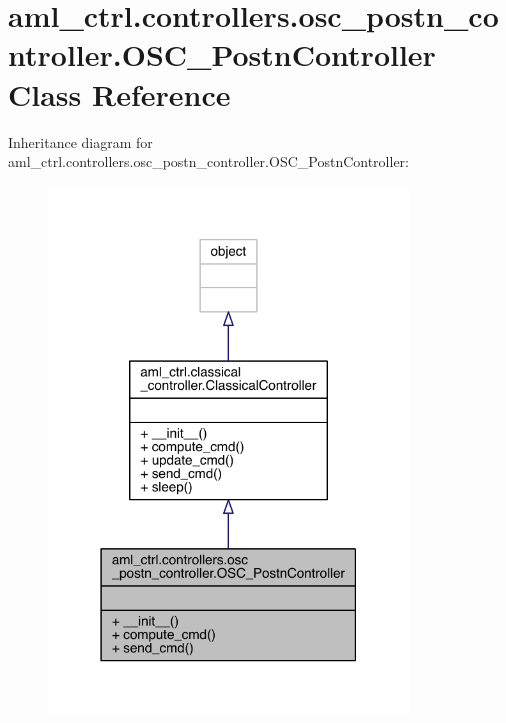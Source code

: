 \hypertarget{classaml__ctrl_1_1controllers_1_1osc__postn__controller_1_1_o_s_c___postn_controller}{}\section{aml\+\_\+ctrl.\+controllers.\+osc\+\_\+postn\+\_\+controller.\+O\+S\+C\+\_\+\+Postn\+Controller Class Reference}
\label{classaml__ctrl_1_1controllers_1_1osc__postn__controller_1_1_o_s_c___postn_controller}


Inheritance diagram for aml\+\_\+ctrl.\+controllers.\+osc\+\_\+postn\+\_\+controller.\+O\+S\+C\+\_\+\+Postn\+Controller\+:
\nopagebreak
\begin{figure}[H]
\begin{center}
\leavevmode
\includegraphics[width=271pt]{classaml__ctrl_1_1controllers_1_1osc__postn__controller_1_1_o_s_c___postn_controller__inherit__graph}
\end{center}
\end{figure}


